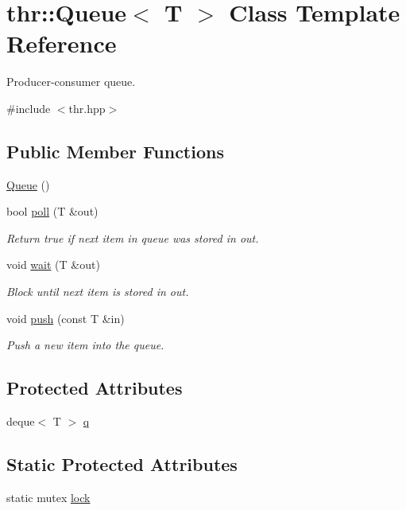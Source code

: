 \hypertarget{classthr_1_1_queue}{\section{thr\-:\-:Queue$<$ T $>$ Class Template Reference}
\label{classthr_1_1_queue}
}


Producer-\/consumer queue.  




{\ttfamily \#include $<$thr.\-hpp$>$}

\subsection*{Public Member Functions}
\begin{DoxyCompactItemize}
\item 
\hyperlink{classthr_1_1_queue_a5b21c17bdad3f7d88f7a30f92a2bd42d}{Queue} ()
\item 
bool \hyperlink{classthr_1_1_queue_a1ce03f6aee29d5dc8e4b3a247de063e5}{poll} (T \&out)
\begin{DoxyCompactList}\small\item\em Return {\ttfamily true} if next item in queue was stored in {\ttfamily out}. \end{DoxyCompactList}\item 
void \hyperlink{classthr_1_1_queue_ab095129fe0ba3dc63fa7300ffe2b11b9}{wait} (T \&out)
\begin{DoxyCompactList}\small\item\em Block until next item is stored in {\ttfamily out}. \end{DoxyCompactList}\item 
void \hyperlink{classthr_1_1_queue_a62768ce373068fa4b3baf574f5fed995}{push} (const T \&in)
\begin{DoxyCompactList}\small\item\em Push a new item into the queue. \end{DoxyCompactList}\end{DoxyCompactItemize}
\subsection*{Protected Attributes}
\begin{DoxyCompactItemize}
\item 
deque$<$ T $>$ \hyperlink{classthr_1_1_queue_aecde97de4091b83a35dcf2ec42cdcd7b}{q}
\end{DoxyCompactItemize}
\subsection*{Static Protected Attributes}
\begin{DoxyCompactItemize}
\item 
static mutex \hyperlink{classthr_1_1_queue_abadc1f08bfec267edc24baaa442bb451}{lock}
\end{DoxyCompactItemize}


